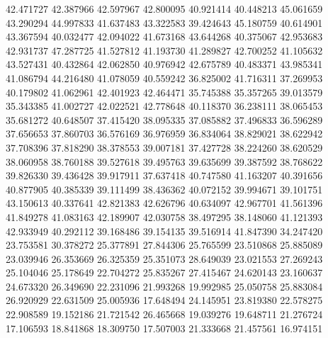 42.471727
42.387966
42.597967
42.800095
40.921414
40.448213
45.061659
43.290294
44.997833
41.637483
43.322583
39.424643
45.180759
40.614901
43.367594
40.032477
42.094022
41.673168
43.644268
40.375067
42.953683
42.931737
47.287725
41.527812
41.193730
41.289827
42.700252
41.105632
43.527431
40.432864
42.062850
40.976942
42.675789
40.483371
43.985341
41.086794
44.216480
41.078059
40.559242
36.825002
41.716311
37.269953
40.179802
41.062961
42.401923
42.464471
35.745388
35.357265
39.013579
35.343385
41.002727
42.022521
42.778648
40.118370
36.238111
38.065453
35.681272
40.648507
37.415420
38.095335
37.085882
37.496833
36.596289
37.656653
37.860703
36.576169
36.976959
36.834064
38.829021
38.622942
37.708396
37.818290
38.378553
39.007181
37.427728
38.224260
38.620529
38.060958
38.760188
39.527618
39.495763
39.635699
39.387592
38.768622
39.826330
39.436428
39.917911
37.637418
40.747580
41.163207
40.391656
40.877905
40.385339
39.111499
38.436362
40.072152
39.994671
39.101751
43.150613
40.337641
42.821383
42.626796
40.634097
42.967701
41.561396
41.849278
41.083163
42.189907
42.030758
38.497295
38.148060
41.121393
42.933949
40.292112
39.168486
39.154135
39.516914
41.847390
34.247420
23.753581
30.378272
25.377891
27.844306
25.765599
23.510868
25.885089
23.039946
26.353669
26.325359
25.351073
28.649039
23.021553
27.269243
25.104046
25.178649
22.704272
25.835267
27.415467
24.620143
23.160637
24.673320
26.349690
22.231096
21.993268
19.992985
25.050758
25.883084
26.920929
22.631509
25.005936
17.648494
24.145951
23.819380
22.578275
22.908589
19.152186
21.721542
26.465668
19.039276
19.648711
21.276724
17.106593
18.841868
18.309750
17.507003
21.333668
21.457561
16.974151
